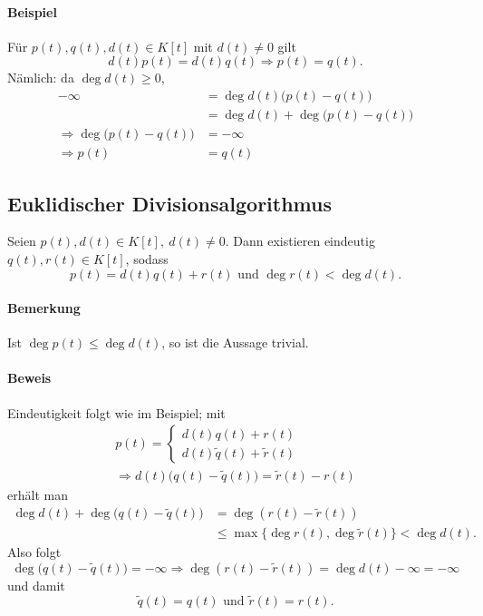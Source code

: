 
\paragraph{Beispiel}
	Für $ p(t),q(t),d(t)\in K[t] $ mit $ d(t)\neq 0 $ gilt
		\[ d(t)p(t) = d(t)q(t)\Rightarrow p(t)=q(t). \]
	Nämlich: da $ \deg d(t) \geq 0$,
		\begin{align*}
			-\infty &= \deg d(t)\big(p(t)-q(t)\big)\\
			&= \deg d(t)+ \deg\big(p(t)-q(t)\big)\\
			\Rightarrow \deg\big(p(t)-q(t)\big) &= -\infty\\
			\Rightarrow p(t)&=q(t)
		\end{align*}
\subsection{Euklidischer Divisionsalgorithmus}
	\begin{Satz}
	Seien $ p(t), d(t) \in K[t],\ d(t) \neq 0$. Dann existieren eindeutig $ q(t), r(t) \in K[t] $, sodass
		\[ p(t)= d(t)q(t) + r(t) \text{ und } \deg r(t) < \deg d(t). \]
	\end{Satz}
\paragraph{Bemerkung}
	Ist $ \deg p(t)\leq \deg d(t) $, so ist die Aussage trivial.
\paragraph{Beweis}
	Eindeutigkeit folgt wie im Beispiel; mit
		\begin{gather*}
		p(t) =
			\begin{cases}
				d(t)q(t)+r(t)\\
				d(t)\tilde{q}(t)+\tilde{r}(t)
			\end{cases}\\
		\Rightarrow d(t)\big(q(t)-\tilde{q}(t)\big) = \tilde{r}(t)-r(t)
		\end{gather*}
	erhält man
		\begin{align*}
			\deg d(t) + \deg \big(q(t)-\tilde{q}(t)\big) &= \deg (r(t)-\tilde{r}(t))\\
			&\leq \max \{\deg r(t), \deg \tilde{r} (t)\} < \deg d(t).
		\end{align*}
	Also folgt
		\[ \deg\big(q(t)-\tilde{q}(t)\big) = -\infty \Rightarrow \deg (r(t)-\tilde{r}(t)) = \deg d(t) -\infty = - \infty \]
	und damit
		\[ \tilde{q}(t)=q(t) \text{ und }\tilde{r}(t) = r(t). \]
	

